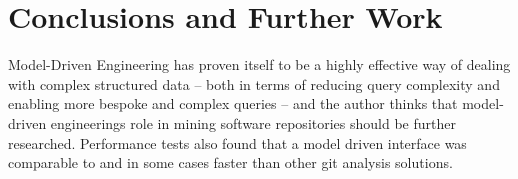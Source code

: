 \documentclass[runningheads,a4paper]{llncs}
\begin{document}

\section{Conclusions and Further Work}
Model-Driven Engineering has proven itself to be a highly effective way of dealing with complex structured data -- both in terms of reducing query complexity and enabling more bespoke and complex queries -- and the author thinks that model-driven engineerings role in mining software repositories should be further researched. Performance tests also found that a model driven interface was comparable to and in some cases faster than other git analysis solutions.
\end{document}
